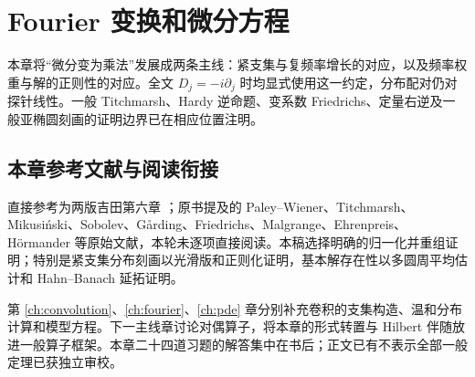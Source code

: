 \chapter{Fourier 变换和微分方程}\label{ch:yosida-06}

本章将“微分变为乘法”发展成两条主线：紧支集与复频率增长的对应，以及频率权重与解的正则性的对应。全文 $D_j=-i\partial_j$ 时均显式使用这一约定，分布配对仍对探针线性。一般 Titchmarsh、Hardy 逆命题、变系数 Friedrichs、定量右逆及一般亚椭圆刻画的证明边界已在相应位置注明。














\section*{本章参考文献与阅读衔接}
直接参考为两版吉田第六章 \cite{yosida-zh,yosida-en}；原书提及的 Paley--Wiener、Titchmarsh、Mikusiński、Sobolev、Gårding、Friedrichs、Malgrange、Ehrenpreis、H\"ormander 等原始文献，本轮未逐项直接阅读。本稿选择明确的归一化并重组证明；特别是紧支集分布刻画以光滑版和正则化证明，基本解存在性以多圆周平均估计和 Hahn--Banach 延拓证明。

第 \ref{ch:convolution}、\ref{ch:fourier}、\ref{ch:pde} 章分别补充卷积的支集构造、温和分布计算和模型方程。下一主线章讨论对偶算子，将本章的形式转置与 Hilbert 伴随放进一般算子框架。本章二十四道习题的解答集中在书后；正文已有不表示全部一般定理已获独立审校。
